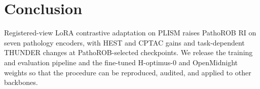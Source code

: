 \documentclass{article}
\begin{document}
\section{Conclusion}

Registered-view LoRA contrastive adaptation on PLISM raises PathoROB RI on seven pathology
encoders, with HEST and CPTAC gains and task-dependent THUNDER changes at PathoROB-selected
checkpoints. We release the training and evaluation pipeline and the fine-tuned H-optimus-0 and
OpenMidnight weights so that the procedure can be reproduced, audited, and applied to other
backbones.





\clearpage

\end{document}
